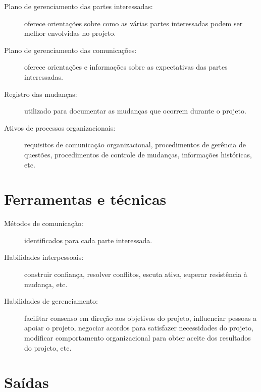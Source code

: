 \begin{description}

	\item[Plano de gerenciamento das partes interessadas:] oferece orientações sobre como as várias partes interessadas podem ser melhor envolvidas no projeto.
	
	\item[Plano de gerenciamento das comunicações:] oferece orientações e informações sobre as expectativas das partes interessadas.
	
	\item[Registro das mudanças:] utilizado para documentar as mudanças que ocorrem durante o projeto.
	
	\item[Ativos de processos organizacionais:] requisitos de comunicação organizacional, procedimentos de gerência de questões, procedimentos de controle de mudanças, informações históricas, etc.
	

\end{description}

\section{Ferramentas e técnicas}

\begin{description}
	
	\item[Métodos de comunicação:] identificados para cada parte interessada.
	
	\item[Habilidades interpessoais:] construir confiança, resolver conflitos, escuta ativa, superar resistência à mudança, etc.
	
	\item[Habilidades de gerenciamento:] facilitar consenso em direção aos objetivos do projeto, influenciar pessoas a apoiar o projeto, negociar acordos para satisfazer necessidades do projeto, modificar comportamento organizacional para obter aceite dos resultados do projeto, etc.
	
\end{description}

\section{Saídas}

